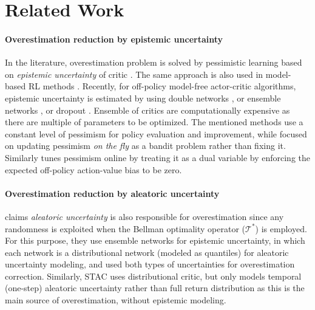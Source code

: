 \documentclass{article}
\begin{document}
\section{Related Work}

\paragraph{Overestimation reduction by epistemic uncertainty} In the literature, overestimation problem is solved by pessimistic learning based on \textit{epistemic uncertainty} of critic \citep{chen2021randomized, hiraoka2021dropout}. The same approach is also used in model-based RL methods \citep{janner2019trust, chua2018deep, depeweg2016learning}. Recently, for off-policy model-free actor-critic algorithms, epistemic uncertainty is estimated by using double networks \citep{fujimoto2018addressing, haarnoja2018soft}, or ensemble networks \citep{chen2021randomized, moskovitz2021tactical}, or dropout \citep{hiraoka2021dropout}. Ensemble of critics are computationally expensive as there are multiple of parameters to be optimized. The mentioned methods use a constant level of pessimism for policy evaluation and improvement, while \citet{moskovitz2021tactical} focused on updating pessimism \textit{on the fly} as a bandit problem rather than fixing it. Similarly \citet{cetin2023learning} tunes pessimism online by treating it as a dual variable  by enforcing the expected off-policy action-value bias to be zero. 

\paragraph{Overestimation reduction by aleatoric uncertainty}  
\citet{kuznetsov2020controlling} claims \textit{aleatoric uncertainty} is also responsible for overestimation since any randomness is exploited when the Bellman optimality operator ($\mathcal{T}^*$) is employed. For this purpose, they use ensemble networks for epistemic uncertainty, in which each network is a distributional network (modeled as quantiles) for aleatoric uncertainty modeling, and used both types of uncertainties for overestimation correction. Similarly, STAC uses distributional critic, but only models temporal (one-step) aleatoric uncertainty rather than full return distribution as this is the main source of overestimation, without epistemic modeling. 
\end{document}
